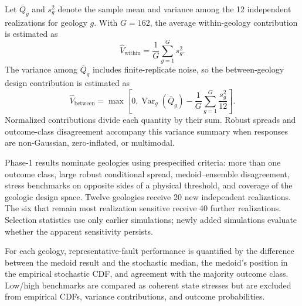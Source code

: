 
Let $\bar Q_g$ and $s_g^2$ denote the sample mean and variance among the 12
independent realizations for geology $g$. With $G=162$, the average
within-geology contribution is estimated as
\begin{equation}
  \widehat V_{\mathrm{within}}
  =\frac{1}{G}\sum_{g=1}^{G}s_g^2.
\end{equation}
The variance among $\bar Q_g$ includes finite-replicate noise, so the
between-geology design contribution is estimated as
\begin{equation}
  \widehat V_{\mathrm{between}}
  =\max\left[0,
  \operatorname{Var}_g(\bar Q_g)
  -\frac{1}{G}\sum_{g=1}^{G}\frac{s_g^2}{12}\right].
\end{equation}
Normalized contributions divide each quantity by their sum. Robust spreads
and outcome-class disagreement accompany this variance summary when responses
are non-Gaussian, zero-inflated, or multimodal.


Phase-1 results nominate geologies using prespecified criteria: more than one
outcome class, large robust conditional spread, medoid--ensemble disagreement,
stress benchmarks on opposite sides of a physical threshold, and coverage of
the geologic design space. Twelve geologies receive 20 new independent
realizations. The six that remain most realization sensitive receive 40
further realizations. Selection statistics use only earlier simulations;
newly added simulations evaluate whether the apparent sensitivity persists.


For each geology, representative-fault performance is quantified by the
difference between the medoid result and the stochastic median, the medoid's
position in the empirical stochastic CDF, and agreement with the majority
outcome class. Low/high benchmarks are compared as coherent state stresses but
are excluded from empirical CDFs, variance contributions, and outcome
probabilities. 

